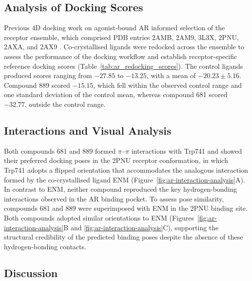 \subsection{Analysis of Docking Scores}
Previous 4D docking work on agonist-bound AR informed selection of the receptor ensemble, which comprised PDB entries 2AMB, 2AM9, 3L3X, 2PNU, 2AXA, and 2AX9 \cite{park2010improved,meyder2019structureprofiler,pereira2006comparison,zhou2010identification,cantin2007structural,bohl2005structural}. Co-crystallised ligands were redocked across the ensemble to assess the performance of the docking workflow and establish receptor-specific reference docking scores (Table~\ref{tab:ar_redocking_scores}). The control ligands produced scores ranging from $-27.85$ to $-13.25$, with a mean of $-20.23 \pm 5.16$. Compound 889 scored $-15.15$, which fell within the observed control range and one standard deviation of the control mean, whereas compound 681 scored $-32.77$, outside the control range.



\subsection{Interactions and Visual Analysis}
Both compounds 681 and 889 formed $\pi$--$\pi$ interactions with Trp741 and showed their preferred docking poses in the 2PNU receptor conformation, in which Trp741 adopts a flipped orientation that accommodates the analogous interaction formed by the co-crystallised ligand ENM (Figure~\ref{fig:ar-interaction-analysis}A). In contrast to ENM, neither compound reproduced the key hydrogen-bonding interactions observed in the AR binding pocket. To assess pose similarity, compounds 681 and 889 were superimposed with ENM in the 2PNU binding site. Both compounds adopted similar orientations to ENM (Figures~\ref{fig:ar-interaction-analysis}B and \ref{fig:ar-interaction-analysis}C), supporting the structural credibility of the predicted binding poses despite the absence of these hydrogen-bonding contacts.



\subsection*{Discussion}

